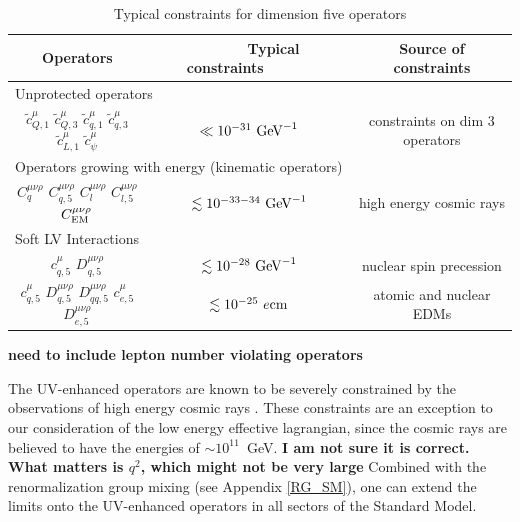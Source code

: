 \documentclass[12pt,preprintnumbers,nofootinbib]{revtex4}
\newcommand{\wt}{\widetilde}
\newcommand{\el}{{\rm EM}}
\begin{document}
\begin{table}[tb]
\label{constr_table}
\caption{Typical constraints for dimension five operators}
\begin{tabular}{|ccc|}
\hline
	\multicolumn{1}{|c|}{Operators} & 
	\multicolumn{1}{|c|}{~~~~~~Typical constraints~~~~~~} & 
	\multicolumn{1}{|c|}{Source of constraints} \\
\hline
	\multicolumn{3}{|l|}{\quad Unprotected operators} \\
\hline
	$ \wt{c}_{Q,1}^\mu  $
	$ \wt{c}_{Q,3}^\mu  $
	$ \wt{c}_{q,1}^\mu  $
	$ \wt{c}_{q,3}^\mu  $
	$ \wt{c}_{L,1}^\mu  $
	$ \wt{c}_{\psi}^\mu $  &
	$ \ll 10^{-31}~{\rm GeV}^{-1} $ &
	constraints on dim 3 operators
	\\
\hline
	\multicolumn{3}{|l|}{\quad Operators growing with energy (kinematic operators)} \\
\hline
	$ C_{q}^{\mu\nu\rho} $ $ C_{q,5}^{\mu\nu\rho} $
	$ C_l^{\mu\nu\rho} $  $ C_{l,5}^{\mu\nu\rho} $
	$ C^{\mu\nu\rho}_\el $ &
	$ \lesssim 10^{-33-34}~{\rm GeV}^{-1} $
	&
	high energy cosmic rays
	\\
\hline
	\multicolumn{3}{|l|}{\quad Soft LV Interactions} \\
\hline
	$ c^\mu_{q,5} $ $ D^{\mu\nu\rho}_{q,5} $ &
	$ \lesssim 10^{-28}~{\rm GeV}^{-1} $     &
	nuclear spin precession \\
\hline
	$ c^\mu_{q,5} $ $ D^{\mu\nu\rho}_{q,5} $ 
	$ D^{\mu\nu\rho}_{qq,5} $ 
	$ c^\mu_{e,5} $ $ D^{\mu\nu\rho}_{e,5} $ &
	$ \lesssim 10^{-25}~e{\rm cm} $          &
	atomic and nuclear EDMs \\
\hline
\end{tabular}
\end{table}
{\bf need to include lepton number violating operators}
	
	The UV-enhanced operators are 
	known to be severely constrained by the
	observations of high energy cosmic rays 
\cite{Gagnon:2004xh}.
	These constraints are an exception to our consideration of the low energy 
	effective lagrangian, since the cosmic rays are believed to have the
	energies of $ \sim 10^{11} $~GeV. {\bf I am not sure it is correct. What matters 
	is $q^2$, which might not be very large}
	Combined with the renormalization group mixing
	(see Appendix \ref{RG_SM}), one can extend
	the limits onto the UV-enhanced operators in all sectors of the Standard Model.
	
\end{document}
